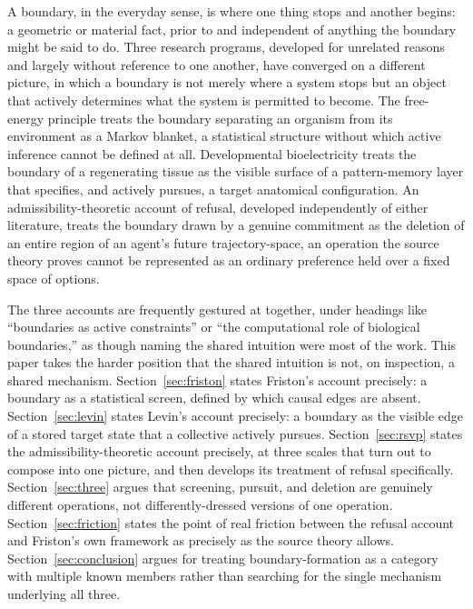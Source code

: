 \documentclass[11pt]{article}
\theoremstyle{plain}
\begin{document}
A boundary, in the everyday sense, is where one thing stops and another begins: a geometric or material fact, prior to and independent of anything the boundary might be said to do. Three research programs, developed for unrelated reasons and largely without reference to one another, have converged on a different picture, in which a boundary is not merely where a system stops but an object that actively determines what the system is permitted to become. The free-energy principle treats the boundary separating an organism from its environment as a Markov blanket, a statistical structure without which active inference cannot be defined at all. Developmental bioelectricity treats the boundary of a regenerating tissue as the visible surface of a pattern-memory layer that specifies, and actively pursues, a target anatomical configuration. An admissibility-theoretic account of refusal, developed independently of either literature, treats the boundary drawn by a genuine commitment as the deletion of an entire region of an agent's future trajectory-space, an operation the source theory proves cannot be represented as an ordinary preference held over a fixed space of options.

The three accounts are frequently gestured at together, under headings like ``boundaries as active constraints'' or ``the computational role of biological boundaries,'' as though naming the shared intuition were most of the work. This paper takes the harder position that the shared intuition is not, on inspection, a shared mechanism. Section~\ref{sec:friston} states Friston's account precisely: a boundary as a statistical screen, defined by which causal edges are absent. Section~\ref{sec:levin} states Levin's account precisely: a boundary as the visible edge of a stored target state that a collective actively pursues. Section~\ref{sec:rsvp} states the admissibility-theoretic account precisely, at three scales that turn out to compose into one picture, and then develops its treatment of refusal specifically. Section~\ref{sec:three} argues that screening, pursuit, and deletion are genuinely different operations, not differently-dressed versions of one operation. Section~\ref{sec:friction} states the point of real friction between the refusal account and Friston's own framework as precisely as the source theory allows. Section~\ref{sec:conclusion} argues for treating boundary-formation as a category with multiple known members rather than searching for the single mechanism underlying all three.
\end{document}
